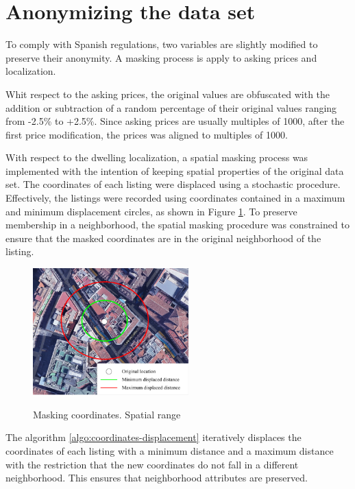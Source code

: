 \documentclass[Royal,times,sageh]{sagej}
\begin{document}
\hypertarget{sec:anonymizing}{%
\section{Anonymizing the data set}\label{sec:anonymizing}}

To comply with Spanish regulations, two variables are slightly modified
to preserve their anonymity. A masking process is apply to asking prices
and localization.

Whit respect to the asking prices, the original values are obfuscated
with the addition or subtraction of a random percentage of their
original values ranging from -2.5\% to +2.5\%. Since asking prices are
usually multiples of 1000, after the first price modification, the
prices was aligned to multiples of 1000.

With respect to the dwelling localization, a spatial masking process was
implemented with the intention of keeping spatial properties of the
original data set. The coordinates of each listing were displaced using
a stochastic procedure. Effectively, the listings were recorded using
coordinates contained in a maximum and minimum displacement circles, as
shown in Figure \ref{fig:points-moved-image}. To preserve membership in
a neighborhood, the spatial masking procedure was constrained to ensure
that the masked coordinates are in the original neighborhood of the
listing.

\begin{figure}[!ht]
  \caption{Masking coordinates. Spatial range}
  \centering
  \includegraphics[width=6cm, height=4.9cm]{EPB_files/points-moved-image.png}
  \label{fig:points-moved-image}
\end{figure}

The algorithm \ref{algo:coordinates-displacement} iteratively displaces
the coordinates of each listing with a minimum distance and a maximum
distance with the restriction that the new coordinates do not fall in a
different neighborhood. This ensures that neighborhood attributes are
preserved.
\end{document}
